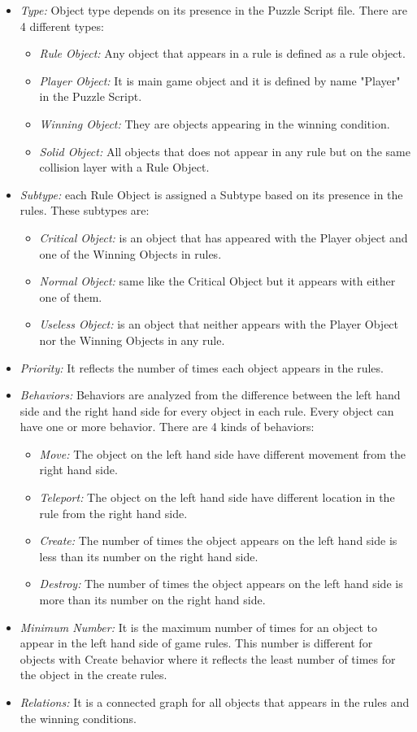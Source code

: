 \documentclass[letterpaper]{article}
\begin{document}
\begin{itemize}
	\item \emph{Type:} Object type depends on its presence in the Puzzle Script file. There are 4 different types:
	\begin{itemize}
		\item \emph{Rule Object:} Any object that appears in a rule is defined as a rule object.
		\item \emph{Player Object:} It is main game object and it is defined by name "Player" in the Puzzle Script.
		\item \emph{Winning Object:} They are objects appearing in the winning condition.
		\item \emph{Solid Object:} All objects that does not appear in any rule but on the same collision layer with a Rule Object.
	\end{itemize}
	\item \emph{Subtype:} each Rule Object is assigned a Subtype based on its presence in the rules. These subtypes are:
	\begin{itemize}
		\item \emph{Critical Object:} is an object that has appeared with the Player object and one of the Winning Objects in rules.
		\item \emph{Normal Object:} same like the Critical Object but it appears with either one of them.
		\item \emph{Useless Object:} is an object that neither appears with the Player Object nor the Winning Objects in any rule.
	\end{itemize}
	\item \emph{Priority:} It reflects the number of times each object appears in the rules.
	\item \emph{Behaviors:} Behaviors are analyzed from the difference between the left hand side and the right hand side for every object in each rule. Every object can have one or more behavior. There are 4 kinds of behaviors:
		\begin{itemize}
			\item \emph{Move:} The object on the left hand side have different movement from the right hand side.
			\item \emph{Teleport:} The object on the left hand side have different location in the rule from the right hand side.
			\item \emph{Create:} The number of times the object appears on the left hand side is less than its number on the right hand side.
			\item \emph{Destroy:} The number of times the object appears on the left hand side is more than its number on the right hand side.
		\end{itemize}
	\item \emph{Minimum Number:} It is the maximum number of times for an object to appear in the left hand side of game rules. This number is different for objects with Create behavior where it reflects the least number of times for the object in the create rules.
	\item \emph{Relations:} It is a connected graph for all objects that appears in the rules and the winning conditions.
\end{itemize}
\end{document}
